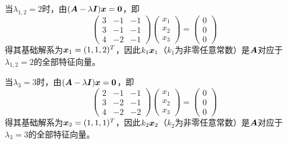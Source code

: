\begin{frame}
  \begin{jie}[续]
    当$\lambda_{1,2}=2$时，由$(\MA-\lambda\MI)\vx=\M0$，即
        $$
        \left(\begin{array}{rrr}
                3&-1&-1\\
                3&-1&-1\\
                4&-2&-1
              \end{array}\right)\left(
              \begin{array}{c}
                x_1\\
                x_2\\
                x_3
              \end{array}
            \right)=\left(
              \begin{array}{c}
                0\\
                0\\
                0
              \end{array}
            \right)
            $$
            得其基础解系为${\boldsymbol{x}}_1=(1,1,2)^T$，因此$k_1{\boldsymbol{x}}_1$（$k_1$为非零任意常数）是$\boldsymbol{A}$对应于$\lambda_{1,2}=2$的全部特征向量。
        \pause\vspace{0.1in}

        当$\lambda_3=3$时，由$(\MA-\lambda\MI)\vx=\M0$，即
        $$
        \left(
          \begin{array}{rrr}
            2&-1&-1\\
            3&-2&-1\\
            4&-2&-2
          \end{array}\right)\left(
          \begin{array}{c}
            x_1\\
            x_2\\
            x_3
          \end{array}
        \right)=\left(
          \begin{array}{c}
            0\\
            0\\
            0
          \end{array}
        \right)
        $$
        得其基础解系为${\boldsymbol{x}}_2=(1,1,1)^T$，因此$k_2{\boldsymbol{x}}_2$（$k_2$为非零任意常数）是$\boldsymbol{A}$对应于$\lambda_3=3$的全部特征向量。
          \end{jie}
  
\end{frame}

